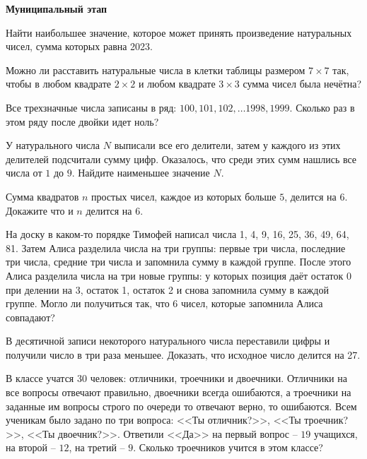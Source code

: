 \documentclass{article}
\begin{document}
    \large

    \begin{center}
        \textbf{Муниципальный этап}
    \end{center}


    \begin{enumerate_boxed}
        \item Найти наибольшее значение, которое может принять произведение натуральных чисел, сумма которых равна 2023.

        \item Можно ли расставить натуральные числа в клетки таблицы размером $7 \times 7$ так, чтобы в любом квадрате $2 \times 2$ и любом квадрате $3 \times 3$ сумма чисел была нечётна?

        \item Все трехзначные числа записаны в ряд: $100, 101, 102, \dotso 1998, 1999$.
        Сколько раз в этом ряду после двойки идет ноль?

        \item У натурального числа $N$ выписали все его делители, затем у каждого из этих делителей подсчитали сумму цифр.
        Оказалось, что среди этих сумм нашлись все числа от $1$ до $9$.
        Найдите наименьшее значение $N$.

        \item Сумма квадратов $n$ простых чисел, каждое из которых больше $5$, делится на $6$.
        Докажите что и $n$ делится на 6.

        \item На доску в каком-то порядке Тимофей написал числа 1, 4, 9, 16, 25, 36, 49, 64, 81.
        Затем Алиса разделила числа на три группы: первые три числа, последние три числа, средние три числа и запомнила сумму в каждой группе.
        После этого Алиса разделила числа на три новые группы: у которых позиция даёт остаток 0 при делении на 3, остаток 1, остаток 2 и снова запомнила сумму в каждой группе.
        Могло ли получиться так, что 6 чисел, которые запомнила Алиса совпадают?

        \item В десятичной записи некоторого натурального числа переставили цифры и получили число в три раза меньшее.
        Доказать, что исходное число делится на 27.

        \item В классе учатся 30 человек: отличники, троечники и двоечники.
        Отличники на все вопросы отвечают правильно, двоечники всегда ошибаются, а троечники на заданные им вопросы строго по очереди то отвечают верно, то ошибаются.
        Всем ученикам было задано по три вопроса: <<Ты отличник?>>, <<Ты троечник?>>, <<Ты двоечник?>>.
        Ответили <<Да>> на первый вопрос – $19$ учащихся, на второй – $12$, на третий – $9$.
        Сколько троечников учится в этом классе?


\end{enumerate_boxed}
\end{document}
